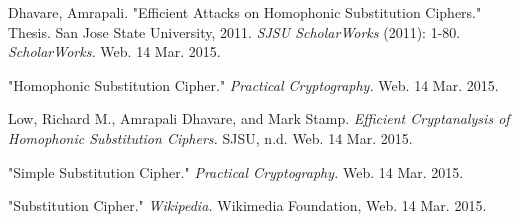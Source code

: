 \documentclass[a4paper,twoside,10pt]{report}
\begin{document}


\clearpage
{}
\begin{thebibliography}{9}
Dhavare, Amrapali.
"Efficient Attacks on Homophonic Substitution Ciphers." Thesis. San Jose State University, 2011. 
\textit{SJSU ScholarWorks} (2011): 1-80. 
\textit{ScholarWorks.} 
Web. 14 Mar. 2015.
 
"Homophonic Substitution Cipher." 
\textit{Practical Cryptography.} 
Web. 14 Mar. 2015.
 
Low, Richard M., Amrapali Dhavare, and Mark Stamp. 
\textit{Efficient Cryptanalysis of Homophonic Substitution Ciphers.}
SJSU, n.d. Web. 14 Mar. 2015.

"Simple Substitution Cipher." 
\textit{Practical Cryptography.} 
Web. 14 Mar. 2015.

"Substitution Cipher." 
\textit{Wikipedia.} 
Wikimedia Foundation, Web. 14 Mar. 2015.
\end{thebibliography}

\appendix
\end{document}
